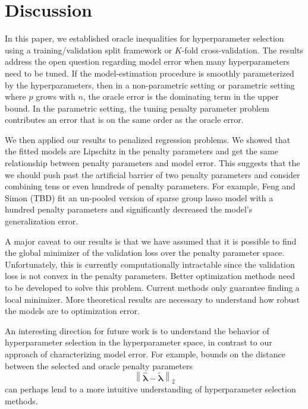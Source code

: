 \documentclass[12pt]{article}
\begin{document}
\section{Discussion}\label{sec:discussion}

In this paper, we established oracle inequalities for hyperparameter selection using a training/validation split framework or $K$-fold cross-validation. The results address the open question regarding model error when many hyperparameters need to be tuned. If the model-estimation procedure is smoothly parameterized by the hyperparameters, then in a non-parametric setting or parametric setting where $p$ grows with $n$, the oracle error is the dominating term in the upper bound. In the parametric setting, the tuning penalty parameter problem contributes an error that is on the same order as the oracle error. 

We then applied our results to penalized regression problems. We showed that the fitted models are Lipschitz in the penalty parameters and get the same relationship between penalty parameters and model error. This suggests that the we should push past the artificial barrier of two penalty parameters and consider combining tens or even hundreds of penalty parameters. For example, Feng and Simon (TBD) fit an un-pooled version of sparse group lasso model with a hundred penalty parameters and significantly decreased the model's generalization error.

A major caveat to our results is that we have assumed that it is possible to find the global minimizer of the validation loss over the penalty parameter space. Unfortunately, this is currently computationally intractable since the validation loss is not convex in the penalty parameters. Better optimization methods need to be developed to solve this problem. Current methods only guarantee finding a local minimizer. More theoretical results are necessary to understand how robust the models are to optimization error.

An interesting direction for future work is to understand the behavior of hyperparameter selection in the hyperparameter space, in contrast to our approach of characterizing model error. For example, bounds on the distance between the selected and oracle penalty parameters
\begin{equation}
\label{penalty_diff}
\left \| \hat{\boldsymbol \lambda} - \tilde{\boldsymbol \lambda} \right \|_2
\end{equation}
can perhaps lend to a more intuitive understanding of hyperparameter selection methods.
\end{document}
